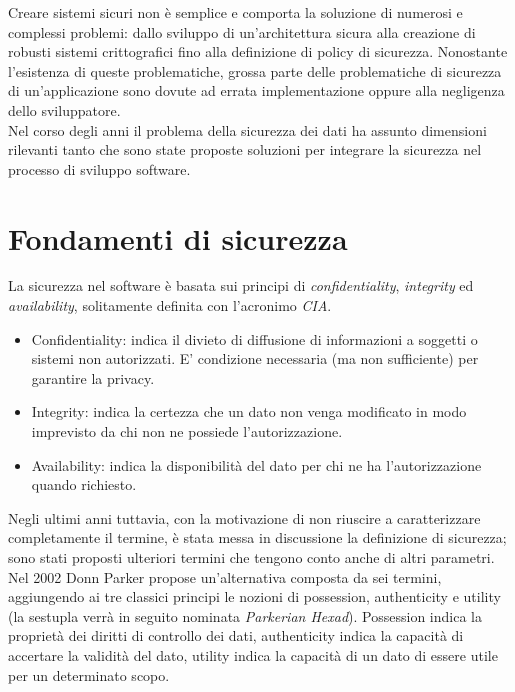 Creare sistemi sicuri non è semplice e comporta la soluzione di numerosi e complessi problemi: dallo sviluppo di un'architettura sicura alla creazione di robusti sistemi crittografici fino alla definizione di policy di sicurezza. Nonostante l'esistenza di queste problematiche, grossa parte delle problematiche di sicurezza di un'applicazione sono dovute ad errata implementazione oppure alla negligenza dello sviluppatore.\\
Nel corso degli anni il problema della sicurezza dei dati ha assunto dimensioni rilevanti tanto che sono state proposte soluzioni per integrare la sicurezza nel processo di sviluppo software.

\section{Fondamenti di sicurezza}
La sicurezza nel software è basata sui principi di \emph{confidentiality}, \emph{integrity} ed \emph{availability}, solitamente definita con l'acronimo \emph{CIA}.\\
\begin{itemize}
\item Confidentiality: indica il divieto di diffusione di informazioni a soggetti o sistemi non autorizzati. E' condizione necessaria (ma non sufficiente) per garantire la privacy.
\item Integrity: indica la certezza che un dato non venga modificato in modo imprevisto da chi non ne possiede l'autorizzazione.
\item Availability: indica la disponibilità del dato per chi ne ha l'autorizzazione quando richiesto.
\end{itemize}
Negli ultimi anni tuttavia, con la motivazione di non riuscire a caratterizzare completamente il termine, è stata messa in discussione la definizione di sicurezza; sono stati proposti ulteriori termini che tengono conto anche di altri parametri. Nel 2002 Donn Parker\cite{parker} propose un'alternativa composta da sei termini, aggiungendo ai tre classici principi le nozioni di possession, authenticity e utility (la sestupla verrà in seguito nominata \emph{Parkerian Hexad}).
Possession indica la proprietà dei diritti di controllo dei dati, authenticity indica la capacità di accertare la validità del dato, utility indica la capacità di un dato di essere utile per un determinato scopo.

